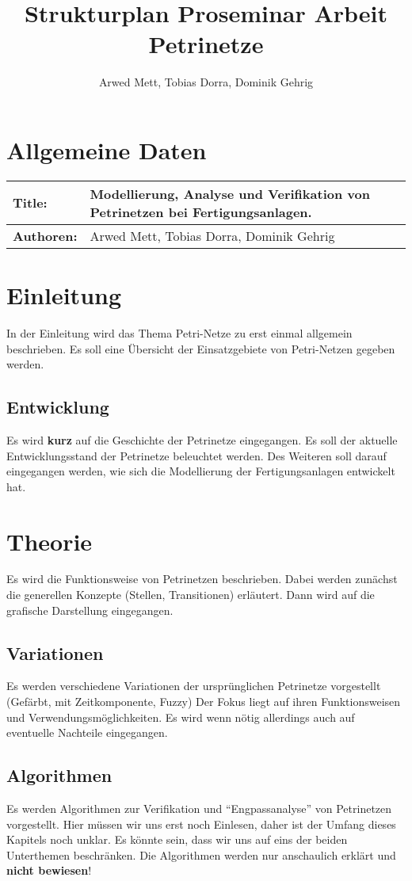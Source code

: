 \documentclass{article}
\author{Arwed Mett, Tobias Dorra, Dominik Gehrig}
\title{Strukturplan Proseminar Arbeit Petrinetze}
\begin{document}
\maketitle

\section{Allgemeine Daten}
\begin{tabularx}{\textwidth}{|X|X|}
    \hline
    \textbf{Title:} & Modellierung, Analyse und Verifikation von Petrinetzen bei Fertigungsanlagen.\\
    \hline
    \textbf{Authoren:} & Arwed Mett, Tobias Dorra, Dominik Gehrig\\
    \hline
\end{tabularx}
\section{Einleitung}
In der Einleitung wird das Thema Petri-Netze zu erst einmal allgemein beschrieben.
Es soll eine Übersicht der Einsatzgebiete von Petri-Netzen gegeben werden.

\subsection{Entwicklung}
Es wird \textbf{kurz} auf die Geschichte der Petrinetze eingegangen.
Es soll der aktuelle Entwicklungsstand der Petrinetze beleuchtet werden.
Des Weiteren soll darauf eingegangen werden, wie sich die Modellierung der Fertigungsanlagen entwickelt hat.
\section{Theorie} 
Es wird die Funktionsweise von Petrinetzen beschrieben.
Dabei werden zunächst die generellen Konzepte (Stellen, Transitionen) erläutert.
Dann wird auf die grafische Darstellung eingegangen.

\subsection{Variationen}
Es werden verschiedene Variationen der ursprünglichen Petrinetze vorgestellt (Gefärbt, mit Zeitkomponente, Fuzzy)
Der Fokus liegt auf ihren Funktionsweisen und Verwendungsmöglichkeiten.
Es wird wenn nötig allerdings auch auf eventuelle Nachteile eingegangen. 

\subsection{Algorithmen}
Es werden Algorithmen zur Verifikation und "`Engpassanalyse"' von Petrinetzen vorgestellt.
Hier müssen wir uns erst noch Einlesen, daher ist der Umfang dieses Kapitels noch unklar. Es könnte sein, dass wir uns auf eins der beiden Unterthemen beschränken.
Die Algorithmen werden nur anschaulich erklärt und \textbf{nicht bewiesen}!
\end{document}
